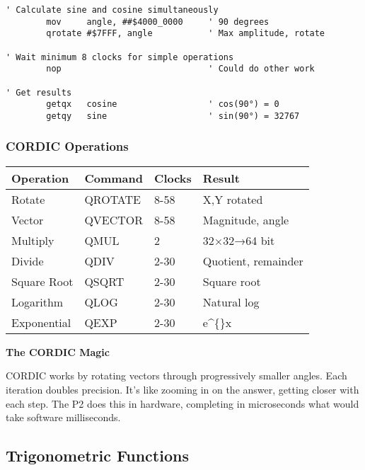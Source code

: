 \documentclass[11pt]{book}
\begin{document}
\begin{lstlisting}
' Calculate sine and cosine simultaneously
        mov     angle, ##$4000_0000     ' 90 degrees
        qrotate #$7FFF, angle           ' Max amplitude, rotate
        
' Wait minimum 8 clocks for simple operations
        nop                             ' Could do other work
        
' Get results
        getqx   cosine                  ' cos(90°) = 0
        getqy   sine                    ' sin(90°) = 32767
\end{lstlisting}

\hypertarget{cordic-operations}{%
\subsubsection{CORDIC Operations}\label{cordic-operations}}

\begin{longtable}[]{@{}llll@{}}
\toprule
Operation & Command & Clocks & Result \\
\midrule
\endhead
Rotate & QROTATE & 8-58 & X,Y rotated \\
Vector & QVECTOR & 8-58 & Magnitude, angle \\
Multiply & QMUL & 2 & 32×32→64 bit \\
Divide & QDIV & 2-30 & Quotient, remainder \\
Square Root & QSQRT & 2-30 & Square root \\
Logarithm & QLOG & 2-30 & Natural log \\
Exponential & QEXP & 2-30 & e\^{}\{\}x \\
\bottomrule
\end{longtable}

\begin{sidetrack}
\textbf{The CORDIC Magic}

CORDIC works by rotating vectors through progressively smaller angles. Each iteration doubles precision. It's like zooming in on the answer, getting closer with each step. The P2 does this in hardware, completing in microseconds what would take software milliseconds.
\end{sidetrack}

\hypertarget{trigonometric-functions}{%
\subsection{Trigonometric Functions}\label{trigonometric-functions}}
\end{document}
